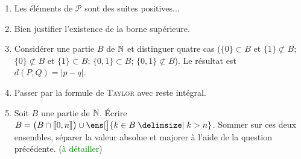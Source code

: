 \begin{elem_sol}
    \begin{enumerate}
        \item Les éléments de $\mathscr{P}$ sont des suites positives...
        \item Bien justifier l'existence de la borne supérieure.
        \item Considérer une partie $B$ de $\mathbb{N}$ et distinguer quatre cas ($\{0\} \subset B$ et $\{1\} \not\subset B$; $\{0\} \not\subset B$ et $\{1\} \subset B$; $\{0, 1\} \subset B$; $ \{0, 1\} \not\subset B$). Le résultat est $d(P, Q) = |p-q|$.
        \item Passer par la formule de \textsc{Taylor} avec reste intégral.
        \item Soit $B$ une partie de $\mathbb{N}$. Écrire $B = \big(B \cap \llbracket0, n \rrbracket \big) \cup \ens[\big]{k \in B \tq k > n}$. Sommer sur ces deux ensembles, séparer la valeur absolue et majorer à l'aide de la question précédente. (\textcolor{green}{à détailler})
    \end{enumerate}
\end{elem_sol}
